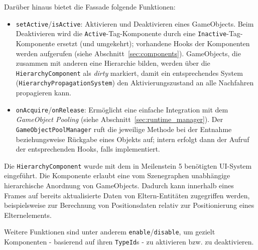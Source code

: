 Darüber hinaus bietet die Fassade folgende Funktionen:

\begin{itemize}
    \itemsep0.5em
    \item \texttt{setActive}/\texttt{isActive}: Aktivieren und Deaktivieren eines GameObjects.
    Beim Deaktivieren wird die \texttt{Active}-Tag-Komponente durch eine \texttt{Inactive}-Tag-Komponente ersetzt (und umgekehrt); vorhandene Hooks der Komponenten werden aufgerufen (siehe Abschnitt~\ref{sec:components}).
    GameObjects, die zusammen mit anderen eine Hierarchie bilden, werden über die \texttt{HierarchyComponent} als \textit{dirty} markiert, damit ein entsprechendes System (\texttt{HierarchyPropagationSystem}) den Aktivierungszustand an alle Nachfahren propagieren kann.
    \item \texttt{onAcquire}/\texttt{onRelease}: Ermöglicht eine einfache Integration mit dem \textit{GameObject Pooling} (siehe Abschnitt~\ref{sec:runtime_manager}).
    Der \texttt{GameObjectPoolManager} ruft die jeweilige Methode bei der Entnahme beziehungsweise Rückgabe eines Objekts auf; intern erfolgt dann der Aufruf der entsprechenden Hooks, falls implementiert.
\end{itemize}

\vspace{5mm}
\begin{tcolorbox}[title={\texttt{HierarchyComponent}: Hierarchische GameObjects}, colback=black!5, colframe=black]
    Die \texttt{HierarchyComponent} wurde mit dem in Meilenstein 5 benötigten UI-System eingeführt.
    Die Komponente erlaubt eine vom Szenegraphen unabhängige hierarchische Anordnung von GameObjects.
    Dadurch kann innerhalb eines Frames auf bereits aktualisierte Daten von Eltern-Entitäten zugegriffen werden, beispielsweise zur Berechnung von Positionsdaten relativ zur Positionierung eines Elternelements.
\end{tcolorbox}
\vspace{5mm}

Weitere Funktionen sind unter anderem \texttt{enable}/\texttt{disable}, um gezielt Komponenten - basierend auf ihren \texttt{TypeId}s - zu aktivieren bzw. zu deaktivieren.